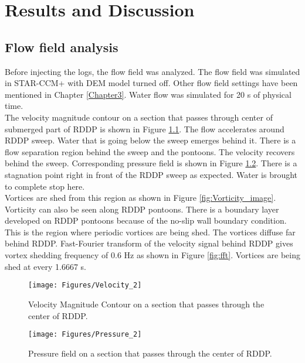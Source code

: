 
\chapter{Results and Discussion} %

\label{Chapter4} %

\section{Flow field analysis}
Before injecting the logs, the flow field was analyzed. The flow field was simulated in STAR-CCM+ with DEM model turned off. Other flow field settings have been mentioned in Chapter \ref{Chapter3}. Water flow was simulated for 20 s of physical time.\\ 
The velocity magnitude contour on a section that passes through center of submerged part of RDDP is shown in Figure \ref{fig:Vel_Mag_middle}. The flow accelerates around RDDP sweep. Water that is going below the sweep emerges behind it. There is a flow separation region behind the sweep and the pontoons. The velocity recovers behind the sweep. Corresponding pressure field is shown in Figure \ref{fig:Pressure_middle}. There is a stagnation point right in front of the RDDP sweep as expected. Water is brought to complete stop here.\\ 
Vortices are shed from this region as shown in Figure \ref{fig:Vorticity_image}. Vorticity can also be seen along RDDP pontoons. There is a boundary layer developed on RDDP pontoons because of the no-slip wall boundary condition. This is the region where periodic vortices are being shed. The vortices diffuse far behind RDDP. Fast-Fourier transform of the velocity signal behind RDDP gives vortex shedding frequency of 0.6 Hz as shown in Figure \ref{fig:fft}. Vortices are being shed at every 1.6667 s. 

\begin{figure}
\centering
\texttt{[image: Figures/Velocity\_2]}
\caption{\label{fig:Vel_Mag_middle}Velocity Magnitude Contour on a section that passes through the center of RDDP.}
\end{figure}

\begin{figure}
\centering
\texttt{[image: Figures/Pressure\_2]}
\caption{\label{fig:Pressure_middle}Pressure field on a section that passes through the center of RDDP.}
\end{figure}

